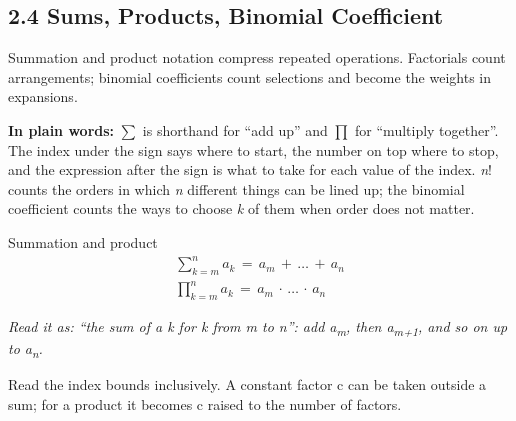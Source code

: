 \documentclass[11pt]{article}
\begin{document}
\begin{keepsection}
\section{2.4 Sums, Products, Binomial Coefficient}

Summation and product notation compress repeated operations. Factorials count arrangements; binomial coefficients count selections and become the weights in expansions.

\begin{plainbox}\textbf{In plain words:} \ensuremath{\textstyle\sum} is shorthand for “add up” and \ensuremath{\textstyle\prod} for “multiply together”. The index under the sign says where to start, the number on top where to stop, and the expression after the sign is what to take for each value of the index. \textit{n}! counts the orders in which \textit{n} different things can be lined up; the binomial coefficient counts the ways to choose \textit{k} of them when order does not matter.\end{plainbox}

\begin{equationcard}{Summation and product}
\[ \begin{gathered} \sum_{{k}={m}}^{{n}} {a}_{{k}}\, =\, {a}_{{m}}\, +\, …\, +\, {a}_{{n}} \\ \prod_{{k}={m}}^{{n}} {a}_{{k}}\, =\, {a}_{{m}}\, \cdot \, …\, \cdot \, {a}_{{n}} \end{gathered} \]
{\small \emph{Read it as: “the sum of a k for k from m to n”: add a\textsubscript{m}, then a\textsubscript{m+1}, and so on up to a\textsubscript{n}.}\par Read the index bounds inclusively. A constant factor c can be taken outside a sum; for a product it becomes c raised to the number of factors.}
\end{equationcard}


\end{keepsection}
\end{document}
